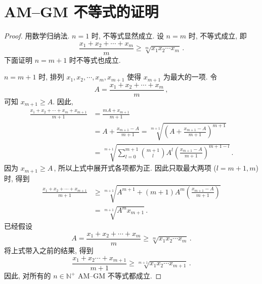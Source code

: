 \documentclass{book}
\newcommand{\N}{\mathbb{N}}
\renewcommand{\ge}{\geqslant}
\numberwithin{equation}{section}
\numberwithin{figure}{section}
\theoremstyle{definition}
\begin{document}
\section{AM--GM 不等式的证明}
\label{proof:AMGMInequality}
\begin{proof}
  用数学归纳法. $n=1$ 时, 不等式显然成立.
  设 $n=m$ 时, 不等式成立, 即
  \begin{equation}
    \frac{x_1+x_2+\cdots+x_m}{m}\ge\sqrt[m]{x_1x_2\cdots x_m}\,.
  \end{equation}
  下面证明 $n=m+1$ 时不等式也成立.

  $n=m+1$ 时, 排列 $x_1,x_2,\cdots,x_m,x_{m+1}$ 使得 $x_{m+1}$ 为最大的一项.
  令 
  \begin{equation*}
    A=\frac{x_1+x_2+\cdots+x_m}{m}\,,
  \end{equation*}
  可知 $x_{m+1}\ge A$.
  因此,
  \begin{align*}
    \frac{x_1+x_2+\cdots+x_m+x_{m+1}}{m+1}&=\frac{mA+x_{m+1}}{m+1}\\
    &=A+\frac{x_{m+1}-A}{m+1}=\sqrt[m+1]{\left( A+\frac{x_{m+1}-A}{m+1} \right)^{m+1}}\\
    &=\sqrt[m+1]{\sum_{l=0}^{m+1}\binom{m+1}{l}A^l\left( \frac{x_{m+1}-A}{m+1} \right)^{m+1-l}}\,.
  \end{align*}
  因为 $x_{m+1}\ge A$\,, 所以上式中展开式各项都为正. 因此只取最大两项 ($l=m+1,m$) 时, 得到
  \begin{align*}
    \frac{x_1+x_2+\cdots+x_{m+1}}{m+1}&\ge\sqrt[m+1]{A^{m+1}+(m+1)A^m\left( \frac{x_{m+1}-A}{m+1} \right)}\\ 
    &=\sqrt[m+1]{A^m x_{m+1}}\,.
  \end{align*}
  已经假设
  \begin{equation*}
    A=\frac{x_1+x_2+\cdots+x_m}{m}\ge \sqrt[m]{x_1x_2\cdots x_m}\,.
  \end{equation*}
  将上式带入之前的结果, 得到
  \begin{equation*}
    \frac{x_1+x_2\cdots+x_{m+1}}{m+1}\ge \sqrt[m+1]{x_1x_2\cdots x_{m+1}}\,.
  \end{equation*}
  因此, 对所有的 $n\in\N^+$ AM--GM 不等式都成立.
\end{proof}
\end{document}
